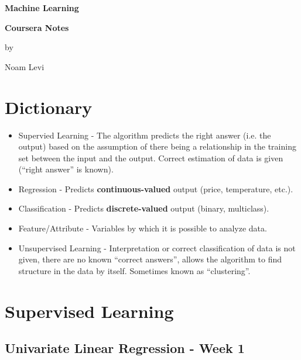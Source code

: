 \documentclass[12pt] {article}
\begin{document}
\begin{titlepage}
  \centering
  \vspace*{1cm}
  {\huge\bfseries Machine Learning} 
  
  {\large\bfseries Coursera Notes}

    \vspace*{7cm}
    {\large by}

    \vspace*{1cm}

        { \large Noam Levi}
\end{titlepage}

  \newpage

\tableofcontents


  \newpage

  
\section{Dictionary}

  \begin{itemize}
    \item Supervied Learning - The algorithm predicts the right answer (i.e. the output) 
      based on the assumption of there being a relationship in the 
      training set between the input and the output. Correct estimation of data is given (``right answer'' is known).
    \item Regression - Predicts {\bf continuous-valued} output (price, temperature, etc.).
    \item Classification - Predicts {\bf discrete-valued} output (binary, multiclass).
    \item Feature/Attribute - Variables by which it is possible to analyze data.
    \item Unsupervised Learning - Interpretation or correct classification of data is not given, there are no known ``correct answers'', allows the algorithm to find structure in the data by itself.
    Sometimes known as ``clustering''.
   \end{itemize} 

  \newpage
	

\section{Supervised Learning }
\subsection{Univariate Linear Regression - Week 1}
 
\end{document}
